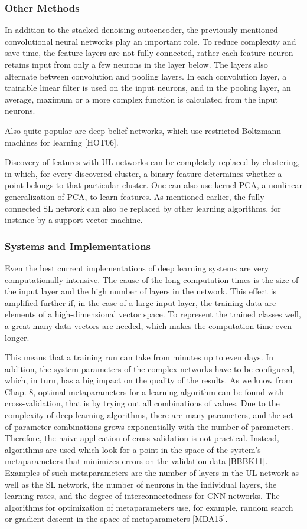 \documentclass[10pt]{article}
\begin{document}
\subsubsection*{Other Methods}
In addition to the stacked denoising autoencoder, the previously mentioned convolutional neural networks play an important role. To reduce complexity and save time, the feature layers are not fully connected, rather each feature neuron retains input from only a few neurons in the layer below. The layers also alternate between convolution and pooling layers. In each convolution layer, a trainable linear filter is used on the input neurons, and in the pooling layer, an average, maximum or a more complex function is calculated from the input neurons.

Also quite popular are deep belief networks, which use restricted Boltzmann machines for learning [HOT06].

Discovery of features with UL networks can be completely replaced by clustering, in which, for every discovered cluster, a binary feature determines whether a point belongs to that particular cluster. One can also use kernel PCA, a nonlinear generalization of PCA, to learn features. As mentioned earlier, the fully connected SL network can also be replaced by other learning algorithms, for instance by a support vector machine.

\subsubsection*{Systems and Implementations}
Even the best current implementations of deep learning systems are very computationally intensive. The cause of the long computation times is the size of the input layer and the high number of layers in the network. This effect is amplified further if, in the case of a large input layer, the training data are elements of a high-dimensional vector space. To represent the trained classes well, a great many data vectors are needed, which makes the computation time even longer.

This means that a training run can take from minutes up to even days. In addition, the system parameters of the complex networks have to be configured, which, in turn, has a big impact on the quality of the results. As we know from Chap. 8, optimal metaparameters for a learning algorithm can be found with cross-validation, that is by trying out all combinations of values. Due to the complexity of deep learning algorithms, there are many parameters, and the set of parameter combinations grows exponentially with the number of parameters. Therefore, the naive application of cross-validation is not practical. Instead, algorithms are used which look for a point in the space of the system's metaparameters that minimizes errors on the validation data [BBBK11]. Examples of such metaparameters are the number of layers in the UL network as well as the SL network, the number of neurons in the individual layers, the learning rates, and the degree of interconnectedness for CNN networks. The algorithms for optimization of metaparameters use, for example, random search or gradient descent in the space of metaparameters [MDA15].
\end{document}
